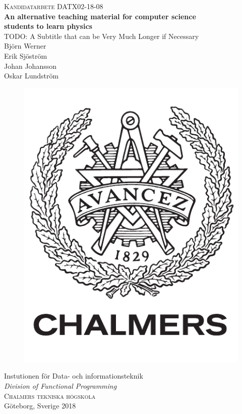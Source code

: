 \newpage
\thispagestyle{empty}
\begin{center}
	\textsc{\large Kandidatarbete DATX02-18-08}\\[4cm]		%
	\textbf{\Large An alternative teaching material for computer science \\ students to learn physics} \\[1cm]
	{\large TODO: A Subtitle that can be Very Much Longer if Necessary}\\[1cm]
  {\large Björn Werner}\\
	{\large Erik Sjöström}\\
	{\large Johan Johansson}\\
  {\large Oskar Lundström}\\

	\vfill
	\begin{figure}[H]
	\centering
	\includegraphics[width=0.2\pdfpagewidth]{figure/auxiliary/logo_swe.pdf} \\
	\end{figure}	\vspace{5mm}

	Instutionen för Data- och informationsteknik \\
	\emph{Division of Functional Programming}\\
	\textsc{Chalmers tekniska högskola} \\
	Göteborg, Sverige 2018 \\
\end{center}



